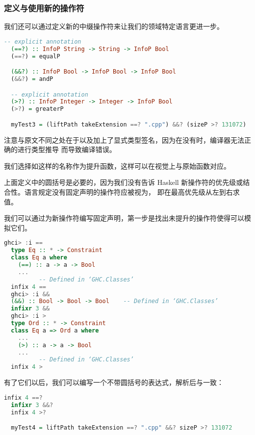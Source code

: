 \documentclass[./main.tex]{subfiles}
\begin{document}
\subsubsection*{定义与使用新的操作符}

我们还可以通过定义新的中缀操作符来让我们的领域特定语言更进一步。

\begin{lstlisting}[language=Haskell]
  -- explicit annotation
  (==?) :: InfoP String -> String -> InfoP Bool
  (==?) = equalP

  (&&?) :: InfoP Bool -> InfoP Bool -> InfoP Bool
  (&&?) = andP

  -- explicit annotation
  (>?) :: InfoP Integer -> Integer -> InfoP Bool
  (>?) = greaterP

  myTest3 = (liftPath takeExtension ==? ".cpp") &&? (sizeP >? 131072)
\end{lstlisting}

注意与原文不同之处在于以及加上了显式类型签名，因为在没有时，编译器无法正确的进行类型推导
而导致编译错误。

我们选择如这样的名称作为提升函数，这样可以在视觉上与原始函数对应。

上面定义中的圆括号是必要的，因为我们没有告诉 Haskell 新操作符的优先级或结合性。语言规定没有固定声明的操作符应被视为，
即在最高优先级从左到右求值。

我们可以通过为新操作符编写固定声明，第一步是找出未提升的操作符使得可以模拟它们。

\begin{lstlisting}[language=Haskell]
  ghci> :i ==
  type Eq :: * -> Constraint
  class Eq a where
    (==) :: a -> a -> Bool
    ...
          -- Defined in ‘GHC.Classes’
  infix 4 ==
  ghci> :i &&
  (&&) :: Bool -> Bool -> Bool    -- Defined in ‘GHC.Classes’
  infixr 3 &&
  ghci> :i >
  type Ord :: * -> Constraint
  class Eq a => Ord a where
    ...
    (>) :: a -> a -> Bool
    ...
          -- Defined in ‘GHC.Classes’
  infix 4 >
\end{lstlisting}

有了它们以后，我们可以编写一个不带圆括号的表达式，解析后与一致：

\begin{lstlisting}[language=Haskell]
  infix 4 ==?
  infixr 3 &&?
  infix 4 >?

  myTest4 = liftPath takeExtension ==? ".cpp" &&? sizeP >? 131072
\end{lstlisting}
\end{document}
